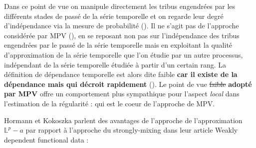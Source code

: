 Dans ce point de vue on manipule directement les tribus engendrées par les différents stades de passé de la série temporelle et on regarde leur degré d'indépendance via la mesure de probabilité (\edited). Il ne s'agit pas de l'approche considérée par MPV (\edited), en se reposant non pas sur l'indépendance des tribus engendrées par le passé de la série temporelle mais en exploitant la qualité d'approximation de la série temporelle que l'on étudie par un autre processus, indépendant de la série temporelle étudiée à partir d'un certain rang. La définition de dépendance temporelle est alors dite \og faible \fg \textbf{car il existe de la dépendance mais qui décroit rapidement} (\edited). Le point de vue \textcolor{flatuicolors_rose}{\sout{{faible}}} \textbf{adopté par MPV} offre un comportement plus sympathique pour l'aspect \emph{local} dans l'estimation de la régularité : qui est le coeur de l'approche de MPV.

Hormann et Kokoszka \cite{10.1214/09-AOS768} parlent des avantages de l'approche de l'approximation $\mathds L^p-a$ par rapport à l'approche du \og strongly-mixing \fg dans leur article \og Weakly dependent functional data \fg :

